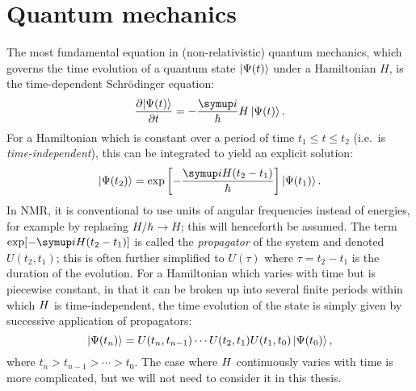 \section{Quantum mechanics}
\label{sec:theory__quantum_mechanics}

The most fundamental equation in (non-relativistic) quantum mechanics, which governs the time evolution of a quantum state $\ket{\Psi(t)}$ under a Hamiltonian $H$, is the time-dependent Schr\"{o}dinger equation:
\begin{equation}
    \label{eq:tdse}
    \frac{\partial\!\ket{\Psi(t)}}{\partial t} = -\frac{\mi}{\hbar}H\ket{\Psi(t)}.
\end{equation}
For a Hamiltonian which is constant over a period of time $t_1 \leq t \leq t_2$ (i.e.\ is \textit{time-independent}), this can be integrated to yield an explicit solution:
\begin{equation}
    \label{eq:time_evolution}
    \ket{\Psi(t_2)} = \exp\left[-\frac{\mi H (t_2 - t_1)}{\hbar}\right]\ket{\Psi(t_1)}.
\end{equation}
In NMR, it is conventional to use units of angular frequencies instead of energies, for example by replacing $H/\hbar \to H$; this will henceforth be assumed.
The term $\exp[-\mi H(t_2 - t_1)]$ is called the \textit{propagator} of the system and denoted $U(t_2, t_1)$; this is often further simplified to $U(\tau)$ where $\tau = t_2 - t_1$ is the duration of the evolution.
For a Hamiltonian which varies with time but is piecewise constant, in that it can be broken up into several finite periods within which $H\/$ is time-independent, the time evolution of the state is simply given by successive application of propagators:
\begin{equation}
    \label{eq:time_evolution_piecewise}
    \ket{\Psi(t_n)} = U(t_n,t_{n-1})\cdots U(t_2,t_1)U(t_1,t_0) \ket{\Psi(t_0)},
\end{equation}
where $t_n > t_{n-1} > \cdots > t_0$.
The case where $H\/$ continuously varies with time is more complicated, but we will not need to consider it in this thesis.

